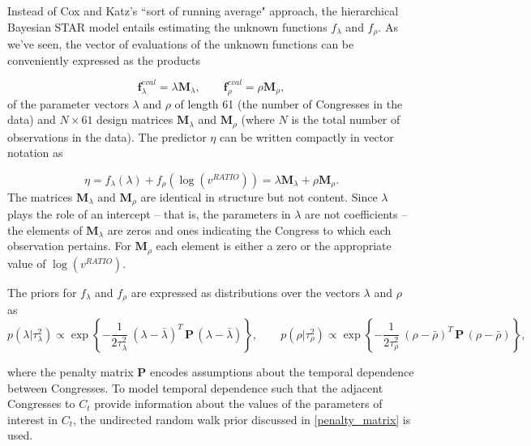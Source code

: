 Instead of Cox and Katz's ``sort of running average" approach, the hierarchical Bayesian STAR model entails estimating the unknown functions $f_\lambda$ and $f_\rho$. As we've seen, the vector of evaluations of the unknown functions can be conveniently expressed as the products 

\begin{equation*}
\mathbf{f}^{eval}_\lambda = \lambda \mathbf{M}_\lambda, 
\qquad 
\mathbf{f}^{eval}_\rho = \rho \mathbf{M}_\rho, 
\end{equation*}
%
\noindent of the parameter vectors $\lambda$ and $\rho$ of length 61 (the number of Congresses in the data) and  $N \times 61$ design matrices  $\mathbf{M}_\lambda$ and  $\mathbf{M}_\rho$ (where $N$ is the total number of observations in the data). The predictor $\eta$ can be written compactly in vector notation as 

\begin{equation*}
 \eta = f_\lambda(\lambda) +  f_\rho(\log{(v^{RATIO})}) = \lambda \mathbf{M}_\lambda + \rho \mathbf{M}_\rho.
\end{equation*}
\indent The matrices $\mathbf{M}_\lambda$ and $\mathbf{M}_\rho$ are identical in structure but not content. Since $\lambda$ plays the role of an intercept -- that is, the parameters in $\lambda$ are not coefficients -- the elements of $\mathbf{M}_\lambda$ are zeros and ones indicating the Congress to which each observation pertains. For $\mathbf{M}_\rho$ each element is either a zero or the appropriate value of $\log{(v^{RATIO})}$. 


The priors for $f_{\lambda}$ and $f_{\rho}$ are expressed as distributions over the vectors $\lambda$ and $\rho$ as 
%
\begin{equation*}
p(\lambda | \tau_\lambda^2) \propto \exp{\left\{-\frac{1}{2\tau_\lambda^2} \: (\lambda - \bar{\lambda})^T \, \mathbf{P}  \, (\lambda - \bar{\lambda}) \right\}}, 
\qquad
p(\rho | \tau_\rho^2) \propto \exp{\left\{-\frac{1}{2\tau_\rho^2} \: (\rho - \bar{\rho})^T \, \mathbf{P} \, (\rho-\bar{\rho}) \right\}},
\end{equation*}

%
\noindent where the penalty matrix $\mathbf{P}$ encodes assumptions about the temporal dependence between Congresses. %
To model temporal dependence such that the adjacent Congresses to $C_t$ provide information about the values of the  parameters of interest in $C_t$, the undirected random walk prior discussed in \ref{penalty_matrix} is used.

